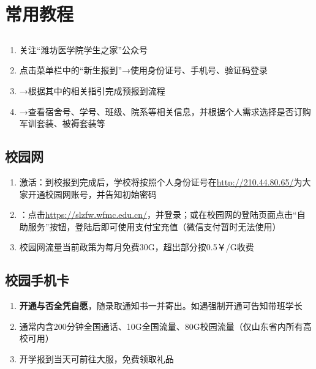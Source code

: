 \chapter[常用教程]{常用教程\vspace{-1em}}

\section[新生信息查询]{}
\label{freshman_query}
\begin{enumerate}
    \item 关注“潍坊医学院学生之家”公众号
    \item 点击菜单栏中的“新生报到”→使用身份证号、手机号、验证码登录
    \item →根据其中的相关指引完成预报到流程
    \item →查看宿舍号、学号、班级、院系等相关信息，并根据个人需求选择是否订购军训套装、被褥套装等\footnotemark
\end{enumerate}

\section[校园网]{校园网\footnotemark}
\begin{enumerate}
    \item 激活：到校报到完成后，学校将按照个人身份证号在\uline{\href{http://210.44.80.65/}{http://210.44.80.65/}}为大家开通校园网账号，并告知初始密码\footnotemark
    \item \textbf{}：点击\uline{\href{https://slzfw.wfmc.edu.cn/}{https://slzfw.wfmc.edu.cn/}}，并登录；或在校园网的登陆页面点击“自助服务”按钮\footnotemark，登陆后即可使用支付宝充值（微信支付暂时无法使用）
    \item 校园网流量当前政策为每月免费30G，超出部分按0.5\textsf{￥}/G收费
\end{enumerate}

\section[校园手机卡]{校园手机卡}
\begin{enumerate}
    \item \textbf{开通与否全凭自愿}，随录取通知书一并寄出。如遇强制开通可告知带班学长
    \item 通常内含200分钟全国通话、10G全国流量、80G校园流量（仅山东省内所有高校可用）\footnotemark
    \item 开学报到当天可前往大服，免费领取礼品
\end{enumerate}


